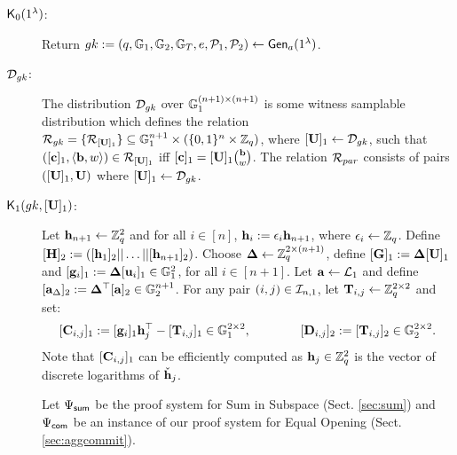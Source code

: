 \begin{description} \label{bits-proof-system}

\item[$\mathsf{K}_0(1^\lambda)$:]  Return $gk := (q,\mathbb{G}_1,\mathbb{G}_2,\mathbb{G}_T,e,\mathcal{P}_1,\mathcal{P}_2) \leftarrow \mathsf{Gen}_a(1^{\lambda})$.

\item[$\mathcal{D}_{gk}$:] The distribution $\mathcal{D}_{gk}$ over $\mathbb{G}_1^{(n+1) \times (n+1)}$ is some witness samplable distribution which 
defines the relation $\mathcal{R}_{gk} = \{\mathcal{R}_{[\mathbf{{U}}]_1}\} 
\subseteq \mathbb{G}_1^{n+1}\times(\{0,1\}^{n}\times\mathbb{Z}_q)$,
where $[\mathbf{{U}}]_1\gets\mathcal{D}_{gk}$,
such that $([\mathbf{c}]_1,\langle\mathbf{b}, w\rangle)\in\mathcal{R}_{[\mathbf{{U}}]_1}$ iff
$[\mathbf{c}]_1=[\mathbf{{U}}]_1\binom{\mathbf{b}}{w}$. The relation $\mathcal{R}_{par}$ consists of pairs $([\mathbf{{U}}]_1,\mathbf{{U}})$ where $[\mathbf{{U}}]_1 \gets \mathcal{D}_{{gk}}$.
\item[$\mathsf{K}_1({gk}, {[\mathbf{{U}}]_1})$:]
Let $\mathbf{h}_{n+1}\gets \mathbb{Z}_q^2$
and for all $i \in [n]$, $\mathbf{h}_{i}:=\epsilon_{i}\mathbf{h}_{n+1}$, where
$\epsilon_{i} \leftarrow \mathbb{Z}_q$. Define
$[{\mathbf{{H}}}]_2 := ([\mathbf{h}_1]_2|| \ldots ||[\mathbf{h}_{n+1}]_2)$.
Choose 
$\mathbf{{\Delta}} \leftarrow \mathbb{Z}_q^{2 \times (n+1)}$,
define $[\mathbf{{G}}]_1 := \mathbf{{\Delta}}[\mathbf{{U}}]_1$
and $[\mathbf{g}_{i}]_1:=\mathbf{{\Delta}} [\mathbf{u}_i]_1 \in \mathbb{G}_1^2$, for all $i \in [n+1]$. 
Let $\mathbf{a} \leftarrow \mathcal{L}_{1}$ and define $[\mathbf{a}_{\Delta}]_2:=\mathbf{{\Delta}}^\top[\mathbf{a}]_2 \in \mathbb{G}_2^{n+1}$. 
For any pair $(i,j) \in \mathcal{I}_{n,1}$, let 
$\mathbf{{T}}_{i,j}\gets\mathbb{Z}_q^{2\times2}$ and set:
$$[\mathbf{{C}}_{i,j}]_1:=[\mathbf{g}_i]_1 \mathbf{h}_j^{\top} - [\mathbf{{T}}_{i,j}]_1  \in \mathbb{G}_1^{2 \times 2},
\qquad \qquad 
[\mathbf{{D}}_{i,j}]_2:=[\mathbf{{T}}_{i,j}]_2 \in \mathbb{G}_2^{2 \times 2}.$$ 
Note that $[\mathbf{{C}}_{i,j}]_1$ can be efficiently computed 
as $\mathbf{h}_j \in \mathbb{Z}_q^{2}$ is the vector of discrete logarithms of $\check{\mathbf{h}}_j$.

Let ${\Psi_{\mathsf{sum}}}$ be the proof system for Sum in Subspace 
(Sect. \ref{sec:sum}) and ${\Psi_{\mathsf{com}}}$
be an instance of our proof system for Equal Opening (Sect. \ref{sec:aggcommit}).


\end{description}
